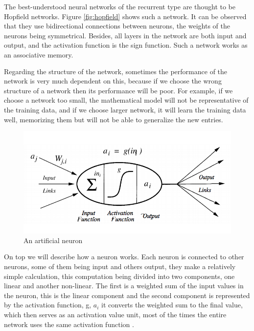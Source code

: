 \par The best-understood neural networks of the recurrent type are thought to be Hopfield networks.
 Figure \ref{fig:hopfield} shows such a network. It can be observed that they use bidirectional connections between neurons, 
 the weights of the neurons being symmetrical. Besides, all layers in the network are both input and output, and the activation function is the sign function. 
Such a network works as an associative memory.

Regarding the structure of the network, sometimes the performance of the network is very much dependent on this, 
because if we choose the wrong structure of a network then its performance will be poor. For example, if we choose a network too small, 
the mathematical model will not be representative of the training data,
 and if we choose larger network, it will learn the training data well, memorizing them but will not be able to generalize the new entries. \cite{book.neuronal.network.1995}


 \begin{figure}[htbp]
	\centerline{\includegraphics[scale=0.75]{fig/un-neuron.png}}  
  \caption{An artificial neuron  \cite{book.neuronal.network.1995}}
  \label{fig:anneuron}
  
\end{figure}

On top we will describe how a neuron works. Each neuron is connected to other neurons, 
some of them being input and others output, they make a relatively simple calculation, 
this computation being divided into two components, one linear and another non-linear. 
The first is a weighted sum of the input values in the neuron, this is the linear component and the 
second component is represented by the activation function, g, $a_i$
it converts the weighted sum to the final value, which then serves as an activation value unit,
 most of the times the entire network uses the same activation function \cite{book.neuronal.network.1995}. 


